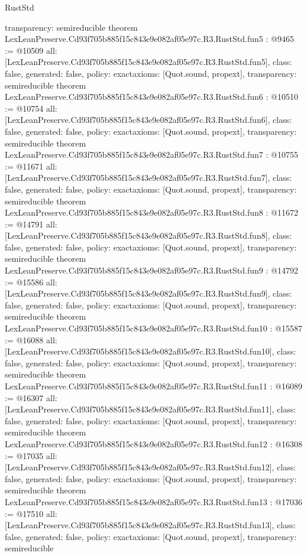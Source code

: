 \begin{lexlean}{RustStd}
\begin{coremodule}
{  transparency: semireducible
}
theorem LexLeanPreserve.Cd93f705b885f15c843e9e082af05e97c.R3.RustStd.fun5 : @9465 := @10509 {
  all: [LexLeanPreserve.Cd93f705b885f15c843e9e082af05e97c.R3.RustStd.fun5],
  class: false,
  generated: false,
  policy: exact{axioms: [Quot.sound, propext]},
  transparency: semireducible
}
theorem LexLeanPreserve.Cd93f705b885f15c843e9e082af05e97c.R3.RustStd.fun6 : @10510 := @10754 {
  all: [LexLeanPreserve.Cd93f705b885f15c843e9e082af05e97c.R3.RustStd.fun6],
  class: false,
  generated: false,
  policy: exact{axioms: [Quot.sound, propext]},
  transparency: semireducible
}
theorem LexLeanPreserve.Cd93f705b885f15c843e9e082af05e97c.R3.RustStd.fun7 : @10755 := @11671 {
  all: [LexLeanPreserve.Cd93f705b885f15c843e9e082af05e97c.R3.RustStd.fun7],
  class: false,
  generated: false,
  policy: exact{axioms: [Quot.sound, propext]},
  transparency: semireducible
}
theorem LexLeanPreserve.Cd93f705b885f15c843e9e082af05e97c.R3.RustStd.fun8 : @11672 := @14791 {
  all: [LexLeanPreserve.Cd93f705b885f15c843e9e082af05e97c.R3.RustStd.fun8],
  class: false,
  generated: false,
  policy: exact{axioms: [Quot.sound, propext]},
  transparency: semireducible
}
theorem LexLeanPreserve.Cd93f705b885f15c843e9e082af05e97c.R3.RustStd.fun9 : @14792 := @15586 {
  all: [LexLeanPreserve.Cd93f705b885f15c843e9e082af05e97c.R3.RustStd.fun9],
  class: false,
  generated: false,
  policy: exact{axioms: [Quot.sound, propext]},
  transparency: semireducible
}
theorem LexLeanPreserve.Cd93f705b885f15c843e9e082af05e97c.R3.RustStd.fun10 : @15587 := @16088 {
  all: [LexLeanPreserve.Cd93f705b885f15c843e9e082af05e97c.R3.RustStd.fun10],
  class: false,
  generated: false,
  policy: exact{axioms: [Quot.sound, propext]},
  transparency: semireducible
}
theorem LexLeanPreserve.Cd93f705b885f15c843e9e082af05e97c.R3.RustStd.fun11 : @16089 := @16307 {
  all: [LexLeanPreserve.Cd93f705b885f15c843e9e082af05e97c.R3.RustStd.fun11],
  class: false,
  generated: false,
  policy: exact{axioms: [Quot.sound, propext]},
  transparency: semireducible
}
theorem LexLeanPreserve.Cd93f705b885f15c843e9e082af05e97c.R3.RustStd.fun12 : @16308 := @17035 {
  all: [LexLeanPreserve.Cd93f705b885f15c843e9e082af05e97c.R3.RustStd.fun12],
  class: false,
  generated: false,
  policy: exact{axioms: [Quot.sound, propext]},
  transparency: semireducible
}
theorem LexLeanPreserve.Cd93f705b885f15c843e9e082af05e97c.R3.RustStd.fun13 : @17036 := @17510 {
  all: [LexLeanPreserve.Cd93f705b885f15c843e9e082af05e97c.R3.RustStd.fun13],
  class: false,
  generated: false,
  policy: exact{axioms: [Quot.sound, propext]},
  transparency: semireducible
}
\end{coremodule}
\end{lexlean}
